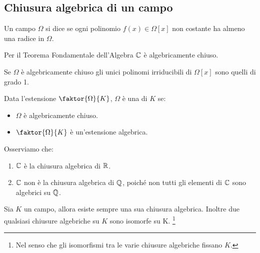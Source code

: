 \documentclass[11pt]{scrartcl}
\begin{document}
\newpage
\subsection{Chiusura algebrica di un campo}
\begin{definition}
    Un campo $\Omega$ si dice  se ogni polinomio $f(x) \in \Omega[x]$ non costante ha almeno una radice in $\Omega$.
\end{definition}

\begin{example}
    Per il Teorema Fondamentale dell'Algebra $\mathbb C$ è algebricamente chiuso.
\end{example}

\begin{remark}
    Se $\Omega$ è algebricamente chiuso gli unici polinomi irriducibili di $\Omega[x]$ sono quelli di grado 1.
\end{remark}

\begin{definition}
    Data l'estensione $\faktor{\Omega}{K}$, $\Omega$ è una  di $K$ se:
    \begin{itemize}
        \item $\Omega$ è algebricamente chiuso.
        \item $\faktor{\Omega}{K}$ è un'estensione algebrica.
    \end{itemize}
\end{definition}

\begin{example}
    Osserviamo che:
    \begin{enumerate}[(1)]
        \item $\mathbb C$ è la chiusura algebrica di $\mathbb R$.
        \item $\mathbb C$ non è la chiusura algebrica di $\mathbb Q$, poiché non tutti gli elementi di $\mathbb C$ sono algebrici su $\mathbb Q$.
    \end{enumerate}
\end{example}

\begin{theorem}
    Sia $K$ un campo, allora esiste sempre una sua chiusura algebrica. Inoltre due qualsiasi chiusure algebriche su $K$ sono isomorfe su K.
    \footnote{Nel senso che gli isomorfismi tra le varie chiusure algebriche fissano $K$.}
\end{theorem}
\end{document}
